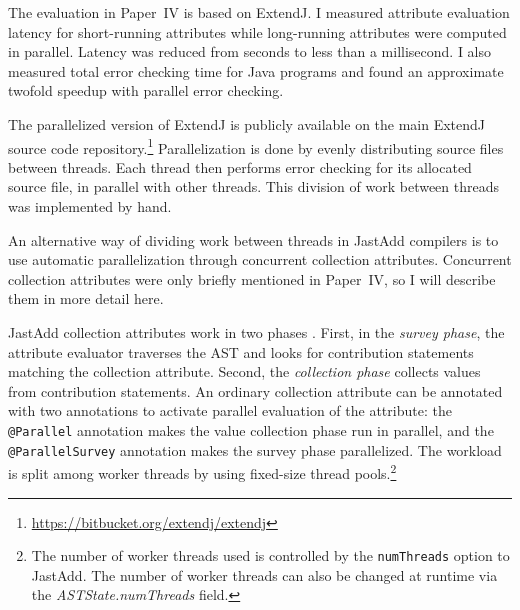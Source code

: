 \documentclass[10pt, twoside, openright]{book}
\begin{document}
The evaluation in Paper~IV is based on ExtendJ. I measured attribute evaluation latency
for short-running attributes while long-running attributes were computed in parallel.
Latency was reduced from seconds to less than a millisecond.
I also measured total error checking time for Java programs and found an approximate twofold
speedup with parallel error checking.

The parallelized version of ExtendJ is publicly available on the main ExtendJ source code
repository.\footnote{\url{https://bitbucket.org/extendj/extendj}}
Parallelization is done by evenly distributing source files between threads. Each thread
then performs error checking for its allocated source file, in parallel with other threads.
This division of work between threads was implemented by hand.

An alternative way of dividing work between threads in JastAdd compilers
is to use automatic parallelization through concurrent collection attributes.
Concurrent collection attributes were only briefly mentioned in Paper~IV, so I will describe them in
more detail here.

JastAdd collection attributes work in two phases \cite{DBLP:conf/scam/MagnussonEH07}.
First, in the \emph{survey phase},
the attribute evaluator traverses the AST and looks for contribution statements matching the
collection attribute. Second, the \emph{collection phase} collects values from contribution
statements.
An ordinary collection attribute can be annotated with two annotations to activate parallel
evaluation of the attribute: the \verb'@Parallel' annotation makes the value collection phase
run in parallel, and the \verb'@ParallelSurvey' annotation makes the survey phase parallelized.
The workload is split among worker threads by using fixed-size thread
pools.\footnote{The number of worker threads used is controlled by the \texttt{numThreads} option to
JastAdd. The number of worker threads can also be changed at runtime via the
\emph{ASTState.numThreads} field.}

%

\end{document}
